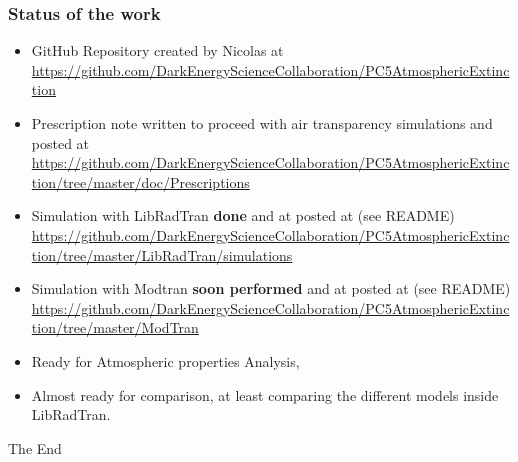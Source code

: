 \documentclass{beamer}
\begin{document}
\begin{frame}
\frametitle{Status of the work}
{\tiny
\begin{itemize}
\item GitHub Repository created by Nicolas at \\
 \href{https://github.com/DarkEnergyScienceCollaboration/PC5AtmosphericExtinction}{https://github.com/DarkEnergyScienceCollaboration/PC5AtmosphericExtinction}
\item Prescription note written to proceed with air transparency simulations and posted at \\
 \href{https://github.com/DarkEnergyScienceCollaboration/PC5AtmosphericExtinction/tree/master/doc/Prescriptions}{https://github.com/DarkEnergyScienceCollaboration/PC5AtmosphericExtinction/tree/master/doc/Prescriptions}
\item Simulation with LibRadTran {\bf done} and at posted at (see README) \\
\href{https://github.com/DarkEnergyScienceCollaboration/PC5AtmosphericExtinction/tree/master/LibRadTran/simulations}{https://github.com/DarkEnergyScienceCollaboration/PC5AtmosphericExtinction/tree/master/LibRadTran/simulations}
\item Simulation with Modtran {\bf soon performed} and at posted at (see README) \\
\href{https://github.com/DarkEnergyScienceCollaboration/PC5AtmosphericExtinction/tree/master/ModTran}{https://github.com/DarkEnergyScienceCollaboration/PC5AtmosphericExtinction/tree/master/ModTran}
\end{itemize}
}

\begin{itemize}
\item Ready for Atmospheric properties Analysis,
\item Almost ready for comparison, at least comparing the different models inside LibRadTran.
\end{itemize}

\end{frame}





\begin{frame}
\Huge{\centerline{The End}}

\end{frame}

\end{document}

